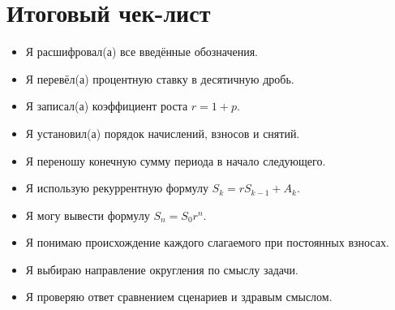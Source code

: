 \documentclass[a4paper,12pt]{article}
\newcommand{\checkitem}{\item[$\square$]}
\begin{document}
\section{Итоговый чек-лист}

\begin{itemize}
  \checkitem Я расшифровал(а) все введённые обозначения.
  \checkitem Я перевёл(а) процентную ставку в десятичную дробь.
  \checkitem Я записал(а) коэффициент роста $r=1+p$.
  \checkitem Я установил(а) порядок начислений, взносов и снятий.
  \checkitem Я переношу конечную сумму периода в начало следующего.
  \checkitem Я использую рекуррентную формулу $S_k=rS_{k-1}+A_k$.
  \checkitem Я могу вывести формулу $S_n=S_0r^n$.
  \checkitem Я понимаю происхождение каждого слагаемого при постоянных взносах.
  \checkitem Я выбираю направление округления по смыслу задачи.
  \checkitem Я проверяю ответ сравнением сценариев и здравым смыслом.
\end{itemize}

\clearpage
\end{document}
